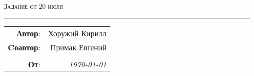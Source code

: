 
\begin{center}
    \Large \textsc{Задание от 20 июля
    }
\end{center}

\hrule

\phantom{42}

\begin{flushright}
    \begin{tabular}{rr}
        \textbf{Автор}: 
        & Хоружий Кирилл \\
        \textbf{Cоавтор}: 
        & Примак Евгений \\
        & \\
        \textbf{От}: &
        \textit{\today}\\
    \end{tabular}
\end{flushright}

\thispagestyle{empty}
